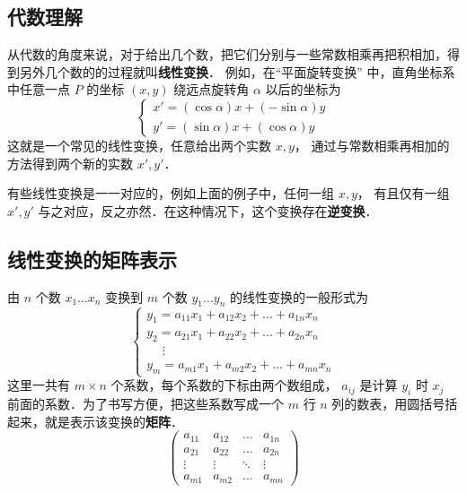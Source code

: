


\subsection{代数理解}
从代数的角度来说，对于给出几个数，把它们分别与一些常数相乘再把积相加，得到另外几个数的的过程就叫\textbf{线性变换}． 例如，在“平面旋转变换” 中，直角坐标系中任意一点 $P$ 的坐标 $(x,y)$ 绕远点旋转角 $\alpha $ 以后的坐标为
\begin{equation}\label{LTrans_eq1}
\begin{cases}
x' = (\cos\alpha) x + (-\sin\alpha)y\\
y' = (\sin \alpha)x + (\cos\alpha)y
\end{cases}
\end{equation}
这就是一个常见的线性变换，任意给出两个实数 $x,y$， 通过与常数相乘再相加的方法得到两个新的实数  $x',y'$． 

有些线性变换是一一对应的，例如上面的例子中，任何一组 $x,y$， 有且仅有一组 $x',y'$ 与之对应，反之亦然．在这种情况下，这个变换存在\textbf{逆变换}．

\subsection{线性变换的矩阵表示}

由 $n$ 个数 $x_1 \ldots x_n$ 变换到 $m$ 个数 $y_1 \ldots y_n$ 的线性变换的一般形式为
\begin{equation}\label{LTrans_eq2}
\begin{cases}
y_1 = a_{11} x_1 + a_{12} x_2 + \ldots + a_{1n} x_n\\
y_2 = a_{21} x_1 + a_{22} x_2 + \ldots + a_{2n} x_n\\
\quad\; \vdots \\
y_m = a_{m1} x_1 + a_{m2} x_2 + \ldots + a_{mn} x_n
\end{cases}
\end{equation} 
这里一共有 $m \times n$ 个系数，每个系数的下标由两个数组成， $a_{ij}$ 是计算 $y_i$ 时 $x_j$ 前面的系数．为了书写方便，把这些系数写成一个 $m$ 行 $n$ 列的数表，用圆括号括起来，就是表示该变换的\textbf{矩阵}．
\begin{equation}\begin{pmatrix}
a_{11} & a_{12} & \ldots & a_{1n}\\
a_{21} & a_{22} & \ldots & a_{2n}\\
 \vdots & \vdots & \ddots & \vdots \\
a_{m1} & a_{m2} & \ldots & a_{mn}
\end{pmatrix}\end{equation} 

